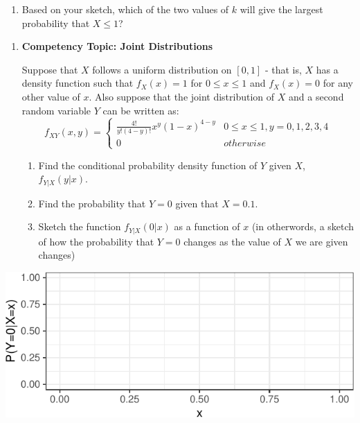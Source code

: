 \documentclass[11pt]{article}
\providecommand{\tightlist}{%
  \setlength{\itemsep}{0pt}\setlength{\parskip}{0pt}}
\begin{document}
\begin{enumerate}
\def\labelenumi{\alph{enumi}.}
\setcounter{enumi}{1}
\tightlist
\item
  Based on your sketch, which of the two values of \(k\) will give the
  largest probability that \(X \le 1\)?
\end{enumerate}

\newpage

\begin{enumerate}
\def\labelenumi{\arabic{enumi}.}
\setcounter{enumi}{2}
\item
  \textbf{Competency Topic: Joint Distributions}

  Suppose that \(X\) follows a uniform distribution on \([0, 1]\) - that
  is, \(X\) has a density function such that \(f_X(x) = 1\) for
  \(0 \le x \le 1\) and \(f_X(x) = 0\) for any other value of \(x\).
  Also suppose that the joint distribution of \(X\) and a second random
  variable \(Y\) can be written as:
  \[ f_{XY}(x, y) = \begin{cases} \frac{4!}{y!(4-y)!} x^y (1-x)^{4-y} & 0 \le x \le 1, y = 0, 1, 2, 3, 4 \\ 0 & otherwise \end{cases} \]

  \begin{enumerate}
  \def\labelenumii{\alph{enumii}.}
  \tightlist
  \item
    Find the conditional probability density function of \(Y\) given
    \(X\), \(f_{Y|X}(y|x)\). \vspace{4cm}
  \item
    Find the probability that \(Y = 0\) given that \(X=0.1\).
    \vspace{3cm}
  \item
    Sketch the function \(f_{Y|X}(0|x)\) as a function of \(x\) (in
    otherwords, a sketch of how the probability that \(Y = 0\) changes
    as the value of \(X\) we are given changes)
  \end{enumerate}
\end{enumerate}

\begin{center}\includegraphics[width=.9\linewidth,height=.4\linewidth]{stat305-cq3_files/figure-latex/unnamed-chunk-3-1} \end{center}
\end{document}
